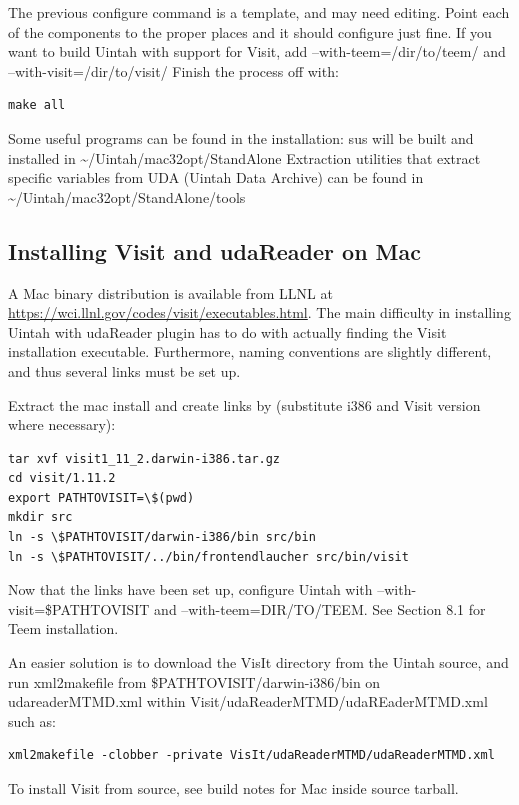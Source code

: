 \documentclass[12pt]{article}
\begin{document}
The previous configure command is a template, and may need editing.
Point each of the components to the proper places and it should
configure just fine.  If you want to build Uintah with support for
Visit, add --with-teem=/dir/to/teem/ and --with-visit=/dir/to/visit/
Finish the process off with:

\begin{verbatim}
make all
\end{verbatim}
  

Some useful programs can be found in the installation: sus will be
built and installed in \textasciitilde/Uintah/mac32opt/StandAlone
Extraction utilities that extract specific variables from UDA (Uintah
Data Archive) can be found in
\textasciitilde/Uintah/mac32opt/StandAlone/tools

\subsection{Installing Visit and udaReader on Mac}

A Mac binary distribution is available from LLNL at
\url{https://wci.llnl.gov/codes/visit/executables.html}.  The main
difficulty in installing Uintah with udaReader plugin has to do with
actually finding the Visit installation executable.  Furthermore,
naming conventions are slightly different, and thus several links must
be set up.

Extract the mac install and create links by (substitute i386 and Visit
version where necessary):

\begin{verbatim}
tar xvf visit1_11_2.darwin-i386.tar.gz
cd visit/1.11.2
export PATHTOVISIT=\$(pwd)
mkdir src
ln -s \$PATHTOVISIT/darwin-i386/bin src/bin
ln -s \$PATHTOVISIT/../bin/frontendlaucher src/bin/visit
\end{verbatim}

Now that the links have been set up, configure Uintah with
--with-visit=\$PATHTOVISIT and --with-teem=DIR/TO/TEEM.  See Section
8.1 for Teem installation.

An easier solution is to download the VisIt directory from the Uintah
source, and run xml2makefile from \$PATHTOVISIT/darwin-i386/bin on
udareaderMTMD.xml within Visit/udaReaderMTMD/udaREaderMTMD.xml such
as:

\begin{verbatim}
xml2makefile -clobber -private VisIt/udaReaderMTMD/udaReaderMTMD.xml
\end{verbatim}

To install Visit from source, see build notes for Mac inside source
tarball.
\end{document}
